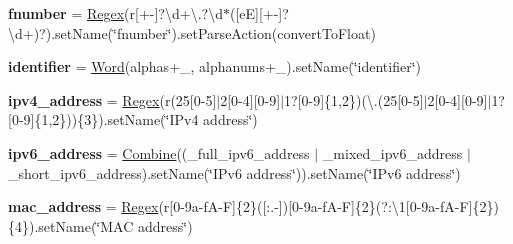 \begin{DoxyCompactItemize}
{\bfseries fnumber} = \hyperlink{classsetuptools_1_1__vendor_1_1pyparsing_1_1_regex}{Regex}(r\textquotesingle{}\mbox{[}+-\/\mbox{]}?\textbackslash{}d+\textbackslash{}.?\textbackslash{}d$\ast$(\mbox{[}eE\mbox{]}\mbox{[}+-\/\mbox{]}?\textbackslash{}d+)?\textquotesingle{}).set\+Name(\char`\"{}fnumber\char`\"{}).set\+Parse\+Action(convert\+To\+Float)
\item 
\mbox{\label{classsetuptools_1_1__vendor_1_1pyparsing_1_1pyparsing__common_ad076ecdad6e0551a5e164323104c7c00}} 
{\bfseries identifier} = \hyperlink{classsetuptools_1_1__vendor_1_1pyparsing_1_1_word}{Word}(alphas+\textquotesingle{}\+\_\+\textquotesingle{}, alphanums+\textquotesingle{}\+\_\+\textquotesingle{}).set\+Name(\char`\"{}identifier\char`\"{})
\item 
\mbox{\label{classsetuptools_1_1__vendor_1_1pyparsing_1_1pyparsing__common_af8e64b42b8a23ed2e9a0dfaef3a61f48}} 
{\bfseries ipv4\+\_\+address} = \hyperlink{classsetuptools_1_1__vendor_1_1pyparsing_1_1_regex}{Regex}(r\textquotesingle{}(25\mbox{[}0-\/5\mbox{]}$\vert$2\mbox{[}0-\/4\mbox{]}\mbox{[}0-\/9\mbox{]}$\vert$1?\mbox{[}0-\/9\mbox{]}\{1,2\})(\textbackslash{}.(25\mbox{[}0-\/5\mbox{]}$\vert$2\mbox{[}0-\/4\mbox{]}\mbox{[}0-\/9\mbox{]}$\vert$1?\mbox{[}0-\/9\mbox{]}\{1,2\}))\{3\}\textquotesingle{}).set\+Name(\char`\"{}I\+Pv4 address\char`\"{})
\item 
\mbox{\label{classsetuptools_1_1__vendor_1_1pyparsing_1_1pyparsing__common_a62da0550b97fa596e52094459be7914c}} 
{\bfseries ipv6\+\_\+address} = \hyperlink{classsetuptools_1_1__vendor_1_1pyparsing_1_1_combine}{Combine}((\+\_\+full\+\_\+ipv6\+\_\+address $\vert$ \+\_\+mixed\+\_\+ipv6\+\_\+address $\vert$ \+\_\+short\+\_\+ipv6\+\_\+address).set\+Name(\char`\"{}I\+Pv6 address\char`\"{})).set\+Name(\char`\"{}I\+Pv6 address\char`\"{})
\item 
\mbox{\label{classsetuptools_1_1__vendor_1_1pyparsing_1_1pyparsing__common_af602690855ca73cfde87efd5d54f307d}} 
{\bfseries mac\+\_\+address} = \hyperlink{classsetuptools_1_1__vendor_1_1pyparsing_1_1_regex}{Regex}(r\textquotesingle{}\mbox{[}0-\/9a-\/f\+A-\/\+F\mbox{]}\{2\}(\mbox{[}\+:.-\/\mbox{]})\mbox{[}0-\/9a-\/f\+A-\/\+F\mbox{]}\{2\}(?\+:\textbackslash{}1\mbox{[}0-\/9a-\/f\+A-\/\+F\mbox{]}\{2\})\{4\}\textquotesingle{}).\+set\+Name(\char`\"{}\+M\+A\+C address\char`\"{})

\end{DoxyCompactItemize}
